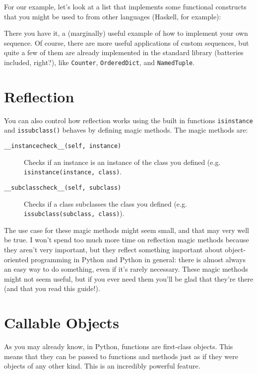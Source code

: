 \documentclass[a4paper,11pt]{article}
\newcommand{\code}[1]{\texttt{#1}}
\begin{document}
For our example, let's look at a list that implements some functional constructs that you might be used to from other languages (Haskell, for example):



\noindent
There you have it, a (marginally) useful example of how to implement your own sequence. Of course, there are more useful applications of custom sequences, but quite a few of them are already implemented in the standard library (batteries included, right?), like \code{Counter}, \code{OrderedDict}, and \code{NamedTuple}.

\section{Reflection}

You can also control how reflection works using the built in functions \code{isinstance} and \code{issubclass()} behaves by defining magic methods. The magic methods are:

\begin{description}

\item[\code{__instancecheck__(self, instance)}]
Checks if an instance is an instance of the class you defined (e.g. \code{isinstance(instance, class)}.
\item[\code{__subclasscheck__(self, subclass)}]
Checks if a class subclasses the class you defined (e.g. \code{issubclass(subclass, class)}).

\end{description}

The use case for these magic methods might seem small, and that may very well be true. I won't spend too much more time on reflection magic methods because they aren't very important, but they reflect something important about object-oriented programming in Python and Python in general: there is almost always an easy way to do something, even if it's rarely necessary. These magic methods might not seem useful, but if you ever need them you'll be glad that they're there (and that you read this guide!).

\section{Callable Objects}

As you may already know, in Python, functions are first-class objects. This means that they can be passed to functions and methods just as if they were objects of any other kind. This is an incredibly powerful feature.
\end{document}
